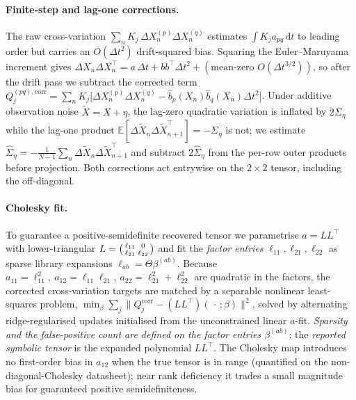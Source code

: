 \documentclass[11pt]{article}
\newcommand{\E}{\mathbb{E}}
\newcommand{\drift}{b}
\newcommand{\diff}{a}
\newcommand{\Kj}{K_j}
\begin{document}
\paragraph{Finite-step and lag-one corrections.}
The raw cross-variation $\sum_n \Kj\,\Delta X_n^{(p)}\Delta X_n^{(q)}$ estimates
$\int \Kj\diff_{pq}\,\mathrm{d}t$ to leading order but carries an $O(\Delta t^2)$ drift-squared
bias. Squaring the Euler--Maruyama increment gives
$\Delta X_n\Delta X_n^\top=\diff\,\Delta t+\drift\drift^\top\Delta t^2
+(\text{mean-zero }O(\Delta t^{3/2}))$, so after the drift pass we subtract the corrected term
$Q^{(pq),\mathrm{corr}}_j=\sum_n
\Kj\bigl[\Delta X_n^{(p)}\Delta X_n^{(q)}-\hat\drift_p(X_n)\hat\drift_q(X_n)\Delta t^2\bigr]$.
Under additive observation noise $\tilde X=X+\eta$, the lag-zero quadratic variation is inflated
by $2\Sigma_\eta$ while the lag-one product
$\E[\Delta\tilde X_n\Delta\tilde X_{n+1}^\top]=-\Sigma_\eta$ is not; we estimate
$\hat\Sigma_\eta=-\tfrac{1}{N-1}\sum_n\Delta\tilde X_n\Delta\tilde X_{n+1}^\top$ and subtract
$2\hat\Sigma_\eta$ from the per-row outer products before projection. Both corrections act
entrywise on the $2\times2$ tensor, including the off-diagonal.

\paragraph{Cholesky fit.}
To guarantee a positive-semidefinite recovered tensor we parametrise $\diff=LL^\top$ with
lower-triangular
$L=\begin{psmallmatrix}\ell_{11}&0\\ \ell_{21}&\ell_{22}\end{psmallmatrix}$ and fit the
\emph{factor entries} $\ell_{11},\ell_{21},\ell_{22}$ as sparse library expansions
$\ell_{ab}=\Theta\beta^{(ab)}$. Because
$\diff_{11}=\ell_{11}^2,\ \diff_{12}=\ell_{11}\ell_{21},\ \diff_{22}=\ell_{21}^2+\ell_{22}^2$
are quadratic in the factors, the corrected cross-variation targets are matched by a separable
nonlinear least-squares problem,
$\min_{\beta}\sum_j\bigl\|Q^{\mathrm{corr}}_j-(LL^\top)(\,\cdot\,;\beta)\bigr\|^2$, solved by
alternating ridge-regularised updates initialised from the unconstrained linear $\diff$-fit.
\emph{Sparsity and the false-positive count are defined on the factor entries $\beta^{(ab)}$};
the \emph{reported symbolic tensor} is the expanded polynomial $LL^\top$. The Cholesky map
introduces no first-order bias in $\diff_{12}$ when the true tensor is in range (quantified on
the non-diagonal-Cholesky datasheet); near rank deficiency it trades a small magnitude bias for
guaranteed positive semidefiniteness.
\end{document}
